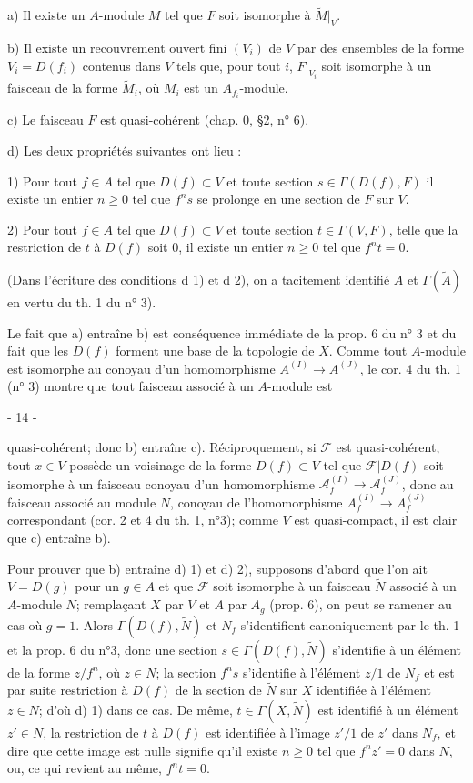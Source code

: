a) Il existe un $A$-module $M$ tel que $F$ soit isomorphe à $\tilde{M}|_V$.

b) Il existe un recouvrement ouvert fini $(V_i)$ de $V$ par des ensembles de la forme $V_i = D(f_i)$ contenus dans $V$ tels que, pour tout $i$, $F|_{V_i}$ soit isomorphe à un faisceau de la forme $\tilde{M}_i$, où $M_i$ est un $A_{f_i}$-module.

c) Le faisceau $F$ est quasi-cohérent (chap. 0, §2, n° 6).

d) Les deux propriétés suivantes ont lieu :

1) Pour tout $f \in A$ tel que $D(f) \subset V$ et toute section $s \in \Gamma(D(f), F)$ il existe un entier $n \ge 0$ tel que $f^n s$ se prolonge en une section de $F$ sur $V$.

2) Pour tout $f \in A$ tel que $D(f) \subset V$ et toute section $t \in \Gamma(V, F)$, telle que la restriction de $t$ à $D(f)$ soit 0, il existe un entier $n \ge 0$ tel que $f^n t = 0$.

(Dans l'écriture des conditions d 1) et d 2), on a tacitement identifié $A$ et $\Gamma(\tilde{A})$ en vertu du th. 1 du n° 3).

Le fait que a) entraîne b) est conséquence immédiate de la prop. 6 du n° 3 et du fait que les $D(f)$ forment une base de la topologie de $X$. Comme tout $A$-module est isomorphe au conoyau d'un homomorphisme $A^{(I)} \to A^{(J)}$, le cor. 4 du th. 1 (n° 3) montre que tout faisceau associé à un $A$-module est

\newpage


- 14 -

quasi-cohérent; donc b) entraîne c). Réciproquement, si $\mathcal{F}$ est quasi-cohérent, tout $x \in V$ possède un voisinage de la forme $D(f) \subset V$ tel que $\mathcal{F}|D(f)$ soit isomorphe à un faisceau conoyau d'un homomorphisme $\mathcal{A}_f^{(I)} \to \mathcal{A}_f^{(J)}$, donc au faisceau associé au module $N$, conoyau de l'homomorphisme $A_f^{(I)} \to A_f^{(J)}$ correspondant (cor. 2 et 4 du th. 1, n°3); comme $V$ est quasi-compact, il est clair que c) entraîne b).

Pour prouver que b) entraîne d) 1) et d) 2), supposons d'abord que l'on ait $V = D(g)$ pour un $g \in A$ et que $\mathcal{F}$ soit isomorphe à un faisceau $\tilde{N}$ associé à un $A$-module $N$; remplaçant $X$ par $V$ et $A$ par $A_g$ (prop. 6), on peut se ramener au cas où $g = 1$. Alors $\Gamma(D(f), \tilde{N})$ et $N_f$ s'identifient canoniquement par le th. 1 et la prop. 6 du n°3, donc une section $s \in \Gamma(D(f), \tilde{N})$ s'identifie à un élément de la forme $z/f^n$, où $z \in N$; la section $f^n s$ s'identifie à l'élément $z/1$ de $N_f$ et est par suite restriction à $D(f)$ de la section de $\tilde{N}$ sur $X$ identifiée à l'élément $z \in N$; d'où d) 1) dans ce cas. De même, $t \in \Gamma(X, \tilde{N})$ est identifié à un élément $z' \in N$, la restriction de $t$ à $D(f)$ est identifiée à l'image $z'/1$ de $z'$ dans $N_f$, et dire que cette image est nulle signifie qu'il existe $n \ge 0$ tel que $f^n z' = 0$ dans $N$, ou, ce qui revient au même, $f^n t = 0$.

